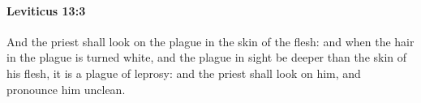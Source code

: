 
		\paragraph{Leviticus 13:3} %
			\label{LEVITICUS-13-3}

			And the priest shall look on the plague in the skin of the flesh: and when the hair in the plague is turned white, and the plague in sight be deeper than the skin of his flesh, it is a plague of leprosy: and the priest shall look on him, and pronounce him unclean.


